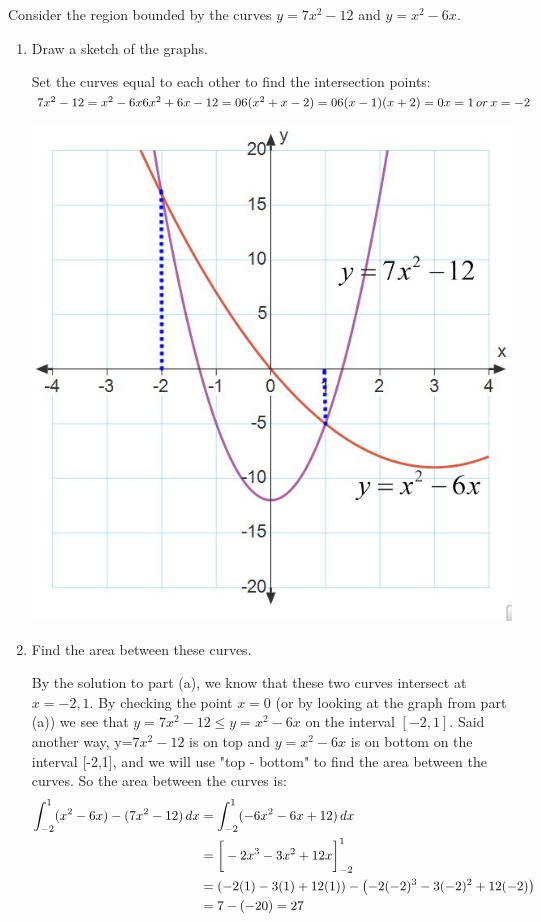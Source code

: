 \documentclass[noinstructornotes]{ximera}
\begin{document}
\begin{problem}
Consider the region bounded by the curves $y=7x^2-12$ and $y=x^2-6x$.
	\begin{enumerate}
		\item  Draw a sketch of the graphs.
		\begin{freeResponse}
		Set the curves equal to each other to find the intersection points: \\
			$7x^2-12=x^2-6x\\
			6x^2+6x-12=0\\
			6(x^2+x-2)=0\\
			6(x-1)(x+2)=0\\
			x=1 \, or \, x=-2		$
			\begin{image}
			\includegraphics[scale=0.5]{Figure6-2-2new.jpg}
			\end{image}
		\end{freeResponse}
		\newpage
		\item  Find the area between these curves.
		\begin{freeResponse}
		By the solution to part (a), we know that these two curves intersect at $x=-2, 1$.  
		By checking the point $x=0$ (or by looking at the graph from part (a)) we see that $y=7x^2-12  \leq y=x^2-6x$ on the interval $[-2,1]$. Said another way, y=$7x^2-12$ is on top and $ y=x^2-6x$ is on bottom on the interval [-2,1], and we will use "top - bottom" to find the area between the curves.  
		So the area between the curves is:
			\begin{align*}
			\int_{-2}^1 (x^2-6x) - (7x^2-12) \,d x &= \int_{-2}^1 (-6x^2-6x+12) \,d x  \\
			&= \bigg[ -2 x^3 -3 x^2 + 12x \bigg]_{-2}^1  \\
			&= \left(-2(1) -3(1) +12(1) \right) - \left(-2(-2)^3 -3(-2)^2 + 12(-2) \right)  \\
			&= 7 - (-20)  = 27
			\end{align*}
		\end{freeResponse}
		

\end{enumerate}
\end{problem}
\end{document}
